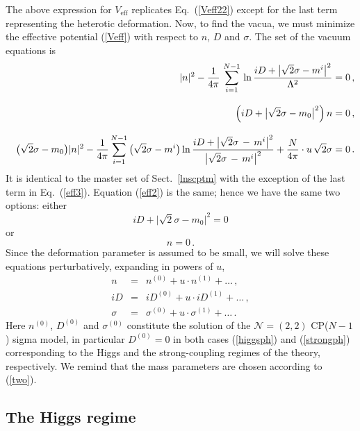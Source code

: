 \documentclass[epsfig,12pt]{article}
\def\beq{\begin{equation}}
\def\eeq{\end{equation}}
\def\beqn{\begin{eqnarray}}
\def\eeqn{\end{eqnarray}}
\def\beqn{\begin{eqnarray}}
\def\eeqn{\end{eqnarray}}
\def\beq{\begin{equation}}
\def\eeq{\end{equation}}
\newcommand{\ntwot}{${\mathcal N}= \left(2,2\right) $ }
\newcommand{\nz}{{n^{(0)}}}
\newcommand{\no}{{n^{(1)}}}
\newcommand{\Dz}{{D^{(0)}}}
\newcommand{\Do}{{D^{(1)}}}
\newcommand{\sigz}{{\sigma^{(0)}}}
\newcommand{\sigo}{{\sigma^{(1)}}}
\begin{document}
{The above expression for $ V_\text{eff} $ replicates Eq.~(\ref{Veff22}) except for the last term 
representing the heterotic deformation.
Now, to find the vacua, we must minimize the 
effective potential (\ref{Veff}) with respect to $n$, $D$ and $ \sigma $. 
The set of the vacuum equations is
\beqn
\label{eff1}
	&&
	|n|^2  -  \frac{1}{4\pi} \,\sum_{i=1}^{N-1}\, 
		{\rm ln}\, 
		\frac{i D + \bigl| \sqrt{2}\sigma -  m^i \bigr|^2}
							{\Lambda^2}   = 0\,, 
\\[3mm]				
	&&
	\left( i D + \bigl|\sqrt{2}\sigma - m_0 \bigr|^2 \right) n = 0\,, 
	\label{eff2}
	\\[3mm]
	&&
	\bigl(\sqrt{2}\sigma - {m_0} \bigr)|n|^2 
		-
	\frac{1}{4\pi} \sum_{i=1}^{N-1}\,
			\bigl(\sqrt{2}\sigma - m^i \bigr)\,
		{\rm ln}\, 
		\frac{i D + \bigl| \sqrt{2}\sigma \,-\,  m^i \bigr|^2}
		{\bigl| \sqrt{2}\sigma \,-\,  m^i \bigr|^2 }
		+ \frac{N}{4\pi} \cdot u\, \sqrt{2}\sigma = 0\,.
\label{eff3}
\nonumber\\
\eeqn
It is identical to the master set of Sect.~\ref{lnscptm}
with the exception of the last term in Eq.~(\ref{eff3}).
Equation (\ref{eff2}) is the same; hence we have the same two options:
 either
\beq
\label{higgsph}
	 iD + \bigl| \sqrt{2}\sigma - { m_0} \bigr|^2 = 0  
\eeq
or
\beq
\label{strongph}
	 n = 0 \,. 
\eeq
Since the deformation parameter is assumed to be small, we 
will solve these equations perturbatively, expanding in powers of  $ u $,
\beqn
	n &=& \nz  + u \cdot \no + \ldots\,,
	\nonumber
	 \\[3mm]
	iD &=& i\Dz  + u \cdot i\Do + \ldots\,, 
	\nonumber
	\\[3mm]
	\sigma &=& \sigz + u \cdot \sigo + \ldots\,.
\eeqn
	Here $ \nz $, $ \Dz $ and $\sigz$ constitute the solution of the \ntwot CP($N-1$) sigma model,
	in particular $ \Dz = 0 $ in both cases (\ref{higgsph}) and  
	(\ref{strongph}) corresponding to the Higgs and the strong-coupling regimes of the theory,
	respectively. We remind that the mass parameters are chosen according to (\ref{two}).
	
	
%
%
\subsection{The Higgs regime}
\label{subshr}

}
\end{document}
